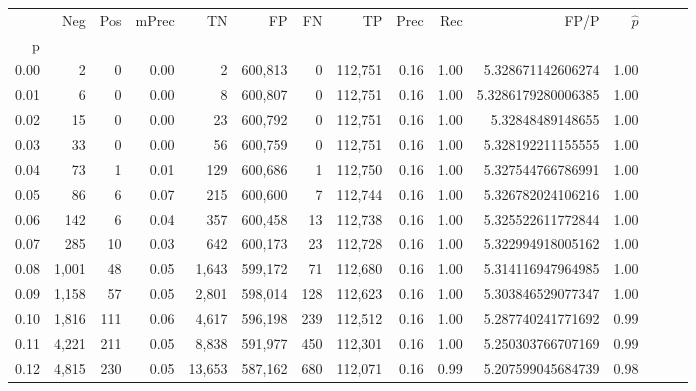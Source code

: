 \begin{tabular}{rrrrrrrrrrrrrrr}
\toprule
{} &     Neg &    Pos & mPrec &       TN &       FP &       FN &       TP &  Prec &   Rec &                    FP/P & $\hat{p}$ \\
p    &         &        &       &          &          &          &          &       &       &                         &           \\
\midrule
0.00 &       2 &      0 &  0.00 &        2 &  600,813 &        0 &  112,751 &  0.16 &  1.00 &       5.328671142606274 &      1.00 \\
0.01 &       6 &      0 &  0.00 &        8 &  600,807 &        0 &  112,751 &  0.16 &  1.00 &      5.3286179280006385 &      1.00 \\
0.02 &      15 &      0 &  0.00 &       23 &  600,792 &        0 &  112,751 &  0.16 &  1.00 &        5.32848489148655 &      1.00 \\
0.03 &      33 &      0 &  0.00 &       56 &  600,759 &        0 &  112,751 &  0.16 &  1.00 &       5.328192211155555 &      1.00 \\
0.04 &      73 &      1 &  0.01 &      129 &  600,686 &        1 &  112,750 &  0.16 &  1.00 &       5.327544766786991 &      1.00 \\
0.05 &      86 &      6 &  0.07 &      215 &  600,600 &        7 &  112,744 &  0.16 &  1.00 &       5.326782024106216 &      1.00 \\
0.06 &     142 &      6 &  0.04 &      357 &  600,458 &       13 &  112,738 &  0.16 &  1.00 &       5.325522611772844 &      1.00 \\
0.07 &     285 &     10 &  0.03 &      642 &  600,173 &       23 &  112,728 &  0.16 &  1.00 &       5.322994918005162 &      1.00 \\
0.08 &   1,001 &     48 &  0.05 &    1,643 &  599,172 &       71 &  112,680 &  0.16 &  1.00 &       5.314116947964985 &      1.00 \\
0.09 &   1,158 &     57 &  0.05 &    2,801 &  598,014 &      128 &  112,623 &  0.16 &  1.00 &       5.303846529077347 &      1.00 \\
0.10 &   1,816 &    111 &  0.06 &    4,617 &  596,198 &      239 &  112,512 &  0.16 &  1.00 &       5.287740241771692 &      0.99 \\
0.11 &   4,221 &    211 &  0.05 &    8,838 &  591,977 &      450 &  112,301 &  0.16 &  1.00 &       5.250303766707169 &      0.99 \\
0.12 &   4,815 &    230 &  0.05 &   13,653 &  587,162 &      680 &  112,071 &  0.16 &  0.99 &       5.207599045684739 &      0.98 \\

\end{tabular}
